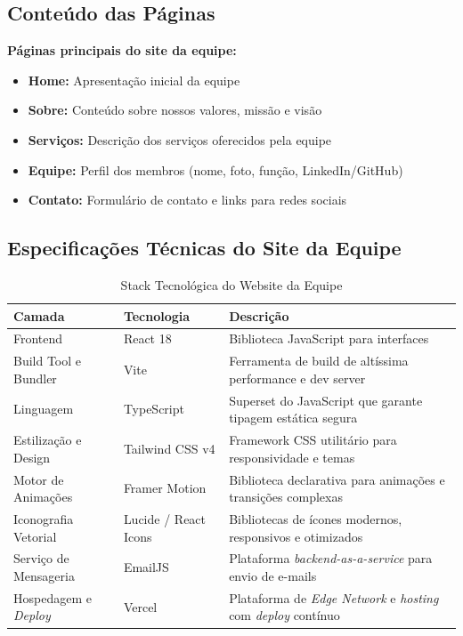 \documentclass[11pt,a4paper]{article}
\begin{document}
\subsection{Conteúdo das Páginas}

\textbf{Páginas principais do site da equipe:}

\begin{itemize}
    \item \textbf{Home:} Apresentação inicial da equipe
    \item \textbf{Sobre:} Conteúdo sobre nossos valores, missão e visão
    \item \textbf{Serviços:} Descrição dos serviços oferecidos pela equipe
    \item \textbf{Equipe:} Perfil dos membros (nome, foto, função, LinkedIn/GitHub)
    \item \textbf{Contato:} Formulário de contato e links para redes sociais
\end{itemize}

\subsection{Especificações Técnicas do Site da Equipe}

\begin{table}[H]
\centering
\caption{Stack Tecnológica do Website da Equipe}
\label{tab:stack-web}
\begin{tabular}{|l|l|p{6cm}|}
\hline
\textbf{Camada} & \textbf{Tecnologia} & \textbf{Descrição} \\
\hline
Frontend & React 18 & Biblioteca JavaScript para interfaces \\
Build Tool e Bundler & Vite & Ferramenta de build de altíssima performance e dev server \\
Linguagem & TypeScript & Superset do JavaScript que garante tipagem estática segura \\
Estilização e Design & Tailwind CSS v4 & Framework CSS utilitário para responsividade e temas \\
Motor de Animações & Framer Motion & Biblioteca declarativa para animações e transições complexas \\
Iconografia Vetorial & Lucide / React Icons & Bibliotecas de ícones modernos, responsivos e otimizados \\
Serviço de Mensageria & EmailJS & Plataforma \textit{backend-as-a-service} para envio de e-mails \\
Hospedagem e \textit{Deploy} & Vercel & Plataforma de \textit{Edge Network} e \textit{hosting} com \textit{deploy} contínuo \\
\hline
\end{tabular}
\end{table}
\end{document}
